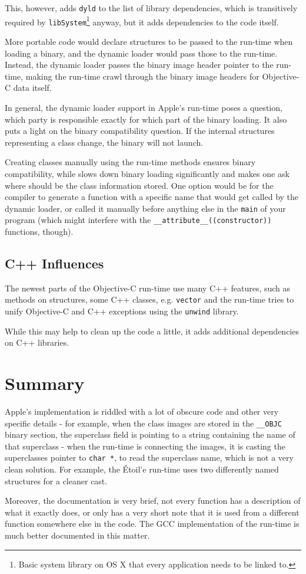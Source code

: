 This, however, adds \verb=dyld= to the list of library dependencies, which is transitively required by \verb=libSystem=\footnote{Basic system library on OS X that every application needs to be linked to.} anyway, but it adds dependencies to the code itself.

More portable code would declare structures to be passed to the run-time when loading a binary, and the dynamic loader would pass those to the run-time. Instead, the dynamic loader passes the binary image header pointer to the run-time, making the run-time crawl through the binary image headers for Objective-C data itself.

In general, the dynamic loader support in Apple's run-time poses a question, which party is responsible exactly for which part of the binary loading. It also puts a light on the binary compatibility question. If the internal structures representing a class change, the binary will not launch.

Creating classes manually using the run-time methods ensures binary compatibility, while slows down binary loading significantly and makes one ask where should be the class information stored. One option would be for the compiler to generate a function with a specific name that would get called by the dynamic loader, or called it manually before anything else in the \verb=main= of your program (which might interfere with the \verb=__attribute__((constructor))= functions, though).

\subsection{C++ Influences}
The newest parts of the Objective-C run-time use many C++ features, such as methods on structures, some C++ classes, e.g. \verb=vector= and the run-time tries to unify Objective-C and C++ exceptions using the \verb=unwind= library.

While this may help to clean up the code a little, it adds additional dependencies on C++ libraries.

\section{Summary}
Apple's implementation is riddled with a lot of obscure code and other very specific details - for example, when the class images are stored in the \verb=__OBJC= binary section, the superclass field is pointing to a string containing the name of that superclass - when the run-time is connecting the images, it is casting the superclasses pointer to \verb=char *=, to read the superclass name, which is not a very clean solution. For example, the \'Etoil'e run-time uses two differently named structures for a cleaner cast. 

Moreover, the documentation is very brief, not every function has a description of what it exactly does, or only has a very short note that it is used from a different function somewhere else in the code. The GCC implementation of the run-time is much better documented in this matter.
